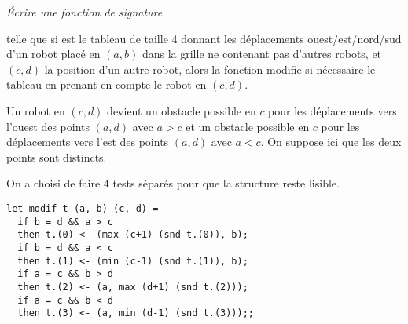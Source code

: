 \begin{Exercise}\it
Écrire une fonction  de signature


telle que si
 est le tableau de taille 4 donnant les déplacements
ouest/est/nord/sud d’un robot placé en $(a,b)$ dans la grille ne
contenant pas d’autres robots, et $(c,d)$ la position d’un autre robot,
alors la fonction modifie si nécessaire le tableau  en prenant en
compte le robot en $(c,d)$.
\end{Exercise}
\begin{Answer}
Un robot en $(c, d)$ devient un obstacle possible en $c$ pour les déplacements vers l'ouest des points $(a, d)$ avec $a > c$ et un obstacle possible en $c$ pour les déplacements vers l'est des points $(a, d)$ avec $a < c$.
On suppose ici que les deux points sont distincts.

On a choisi de faire 4 tests séparés pour que la structure reste lisible.
\begin{lstlisting}
let modif t (a, b) (c, d) =
  if b = d && a > c
  then t.(0) <- (max (c+1) (snd t.(0)), b);
  if b = d && a < c
  then t.(1) <- (min (c-1) (snd t.(1)), b);
  if a = c && b > d
  then t.(2) <- (a, max (d+1) (snd t.(2)));
  if a = c && b < d
  then t.(3) <- (a, min (d-1) (snd t.(3)));;
\end{lstlisting}
\end{Answer}

\medskip

